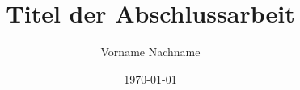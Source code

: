 \newcommand{\Autor}{Vorname Nachname}
\newcommand{\MatrikelNummer}{0123456}

\newcommand{\HochschulName}{Karlsruher Institut für Technologie}
\newcommand{\HochschulOrt}{Karlsruhe}
\newcommand{\LogoKIT}{Bilder/KITlogo_4c_deutsch} %
\newcommand{\FakultaetsName}{Fakultät für Bauingenieur-, Geo- und
Umweltwissenschaften}
\newcommand{\InstitutsName}{Institut für Verkehrswesen}
\newcommand{\LogoInstitut}{Bilder/IfV-logo} %
\newcommand{\InstitutsLeiter}{Prof. Dr.-Ing. Peter Vortisch}
\newcommand{\BetreuerEins}{Erste betreuende Person}
\newcommand{\BetreuerZwei}{Zweite betreuende Person}

\newcommand{\Abschluss}{Masterarbeit}
\newcommand{\Titel}{Titel der Abschlussarbeit}
\newcommand{\AbgabeDatum}{31.12.2099}

\title{\Titel}
\author{\Autor}
\date{\today}
